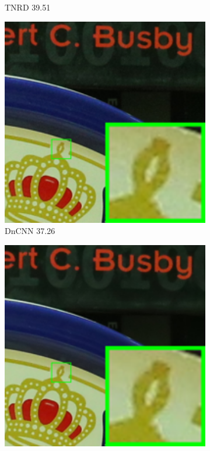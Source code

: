 \begin{figure}
\begin{subfigure}[t]{0.19\textwidth}
\caption{TNRD 39.51}
    \end{subfigure}
    \hfill
    \begin{subfigure}[t]{0.19\textwidth}
        \centering
        \includegraphics[width=1\textwidth]{images/guided/resize_br_DnCNN_5dmark3_iso3200_1_real.png}
\caption{DnCNN 37.26}
    \end{subfigure}
\hfill
    \begin{subfigure}[t]{0.19\textwidth}
        \centering
        \includegraphics[width=1\textwidth]{images/guided/resize_br_NI_5dmark3_iso3200_1_real.png}

\end{subfigure}
\end{figure}
